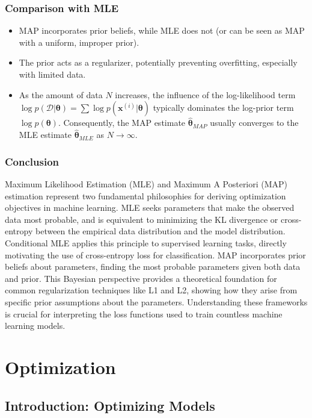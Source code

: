 \documentclass{article}
\begin{document}
\subsubsection{Comparison with MLE}
\begin{itemize}
    \item MAP incorporates prior beliefs, while MLE does not (or can be seen as MAP with a uniform, improper prior).
    \item The prior acts as a regularizer, potentially preventing overfitting, especially with limited data.
    \item As the amount of data $N$ increases, the influence of the log-likelihood term $\log p(\mathcal{D}|\bm{\theta}) = \sum \log p(\mathbf{x}^{(i)}|\bm{\theta})$ typically dominates the log-prior term $\log p(\bm{\theta})$. Consequently, the MAP estimate $\hat{\bm{\theta}}_{MAP}$ usually converges to the MLE estimate $\hat{\bm{\theta}}_{MLE}$ as $N \to \infty$.
\end{itemize}

\subsubsection{Conclusion}

Maximum Likelihood Estimation (MLE) and Maximum A Posteriori (MAP) estimation represent two fundamental philosophies for deriving optimization objectives in machine learning. MLE seeks parameters that make the observed data most probable, and is equivalent to minimizing the KL divergence or cross-entropy between the empirical data distribution and the model distribution. Conditional MLE applies this principle to supervised learning tasks, directly motivating the use of cross-entropy loss for classification. MAP incorporates prior beliefs about parameters, finding the most probable parameters given both data and prior. This Bayesian perspective provides a theoretical foundation for common regularization techniques like L1 and L2, showing how they arise from specific prior assumptions about the parameters. Understanding these frameworks is crucial for interpreting the loss functions used to train countless machine learning models.


\section{Optimization}

\subsection{Introduction: Optimizing Models}
\end{document}
